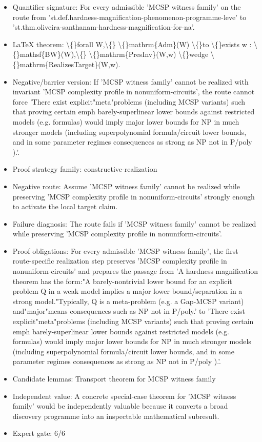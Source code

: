 \documentclass[11pt]{article}
\begin{document}
\begin{itemize}
\item Quantifier signature: For every admissible 'MCSP witness family' on the route from 'st.def.hardness-magnification-phenomenon-programme-leve' to 'st.thm.oliveira-santhanam-hardness-magnification-for-na'.
\item LaTeX theorem: \textbackslash\{\}forall W,\textbackslash\{\} \textbackslash\{\}mathrm\{Adm\}(W) \textbackslash\{\}to \textbackslash\{\}exists w : \textbackslash\{\}mathsf\{BW\}(W),\textbackslash\{\} \textbackslash\{\}mathrm\{PresInv\}(W,w) \textbackslash\{\}wedge \textbackslash\{\}mathrm\{RealizesTarget\}(W,w).
\item Negative/barrier version: If 'MCSP witness family' cannot be realized with invariant 'MCSP complexity profile in nonuniform-circuits', the route cannot force 'There exist explicit"meta"problems (including MCSP variants) such that proving certain emph barely-superlinear lower bounds against restricted models (e.g. formulas) would imply major lower bounds for NP in much stronger models (including superpolynomial formula/circuit lower bounds, and in some parameter regimes consequences as strong as NP not in P/poly ).'.
\item Proof strategy family: constructive-realization
\item Negative route: Assume 'MCSP witness family' cannot be realized while preserving 'MCSP complexity profile in nonuniform-circuits' strongly enough to activate the local target claim.
\item Failure diagnosis: The route fails if 'MCSP witness family' cannot be realized while preserving 'MCSP complexity profile in nonuniform-circuits'.
\item Proof obligations: For every admissible 'MCSP witness family', the first route-specific realization step preserves 'MCSP complexity profile in nonuniform-circuits' and prepares the passage from 'A hardness magnification theorem has the form:"A barely-nontrivial lower bound for an explicit problem Q in a weak model implies a major lower bound/separation in a strong model."Typically, Q is a meta-problem (e.g. a Gap-MCSP variant) and"major"means consequences such as NP not in P/poly.' to 'There exist explicit"meta"problems (including MCSP variants) such that proving certain emph barely-superlinear lower bounds against restricted models (e.g. formulas) would imply major lower bounds for NP in much stronger models (including superpolynomial formula/circuit lower bounds, and in some parameter regimes consequences as strong as NP not in P/poly ).'.
\item Candidate lemmas: Transport theorem for MCSP witness family
\item Independent value: A concrete special-case theorem for 'MCSP witness family' would be independently valuable because it converts a broad discovery programme into an inspectable mathematical subresult.
\item Expert gate: 6/6
\end{itemize}
\end{document}
